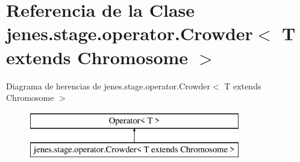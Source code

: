 \hypertarget{classjenes_1_1stage_1_1operator_1_1_crowder_3_01_t_01extends_01_chromosome_01_4}{\section{Referencia de la Clase jenes.\-stage.\-operator.\-Crowder$<$ T extends Chromosome $>$}
\label{classjenes_1_1stage_1_1operator_1_1_crowder_3_01_t_01extends_01_chromosome_01_4}
}
Diagrama de herencias de jenes.\-stage.\-operator.\-Crowder$<$ T extends Chromosome $>$\begin{figure}[H]
\begin{center}
\leavevmode
\includegraphics[height=2.000000cm]{classjenes_1_1stage_1_1operator_1_1_crowder_3_01_t_01extends_01_chromosome_01_4}
\end{center}
\end{figure}
